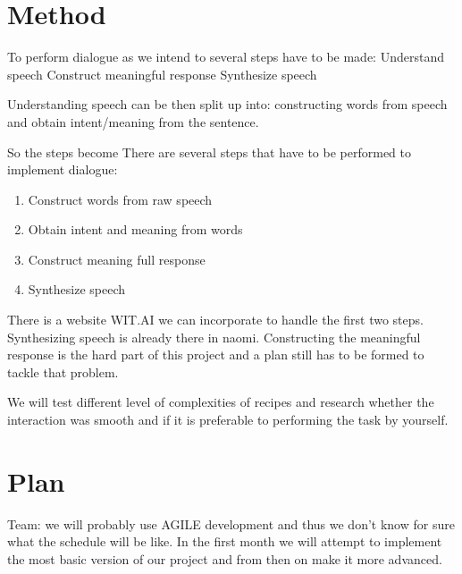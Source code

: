 \documentclass[11pt]{article} %
\begin{document}
\section{Method}
To perform dialogue as we intend to several steps have to be made:
Understand speech
Construct meaningful response
Synthesize speech

Understanding speech can be then split up into: constructing words from speech and obtain intent/meaning from the sentence.

So the steps become
There are several steps that have to be performed to implement dialogue:
\begin{enumerate}
\item Construct words from raw speech
\item Obtain intent and meaning from words
\item Construct meaning full response
\item Synthesize speech
\end{enumerate}

There is a website WIT.AI we can incorporate to handle the first two steps. Synthesizing speech is already there in naomi. Constructing the meaningful response is the hard part of this project and a plan still has to be formed to tackle that problem.

We will test different level of complexities of recipes and research whether the interaction was smooth and if it is preferable to performing the task by yourself.

\section{Plan}
Team: we will probably use AGILE development and thus we don't know for sure what the schedule will be like. In the first month we will attempt to implement the most basic version of our project and from then on make it more advanced.
\end{document}
